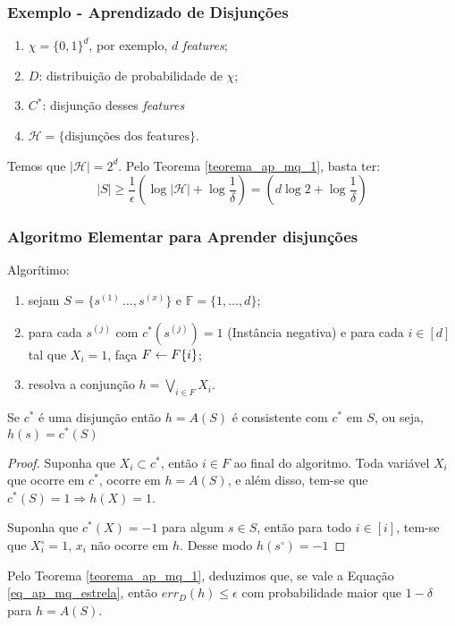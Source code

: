 \subsubsection{Exemplo - Aprendizado de Disjunções}
\begin{enumerate}
    \item $\chi = \{0,1\}^d$, por exemplo, $d$ \emph{features};
    \item $D$: distribuição de probabilidade de $\chi$;
    \item $C^*$: disjunção desses \emph{features}
    \item $\mathcal{H} = \{\text{disjunções dos features}\}$.
\end{enumerate}{}

Temos que $|\mathcal{H}| = 2^d$. Pelo Teorema \ref{teorema_ap_mq_1}, basta ter:
\begin{equation}
\label{eq_ap_mq_estrela}
    |S| \geq \frac{1}{\epsilon}\left(\log{|\mathcal{H}|} + \log{\frac{1}{\delta}}\right) = \left(d\log{2} + \log{\frac{1}{\delta}}\right)
\end{equation}

\subsubsection*{Algoritmo Elementar para Aprender disjunções}

Algorítimo:
\begin{enumerate}
    \item sejam $S = \{s^{(1)}\, \dots, s^{(x)}\}$ e $\mathbb{F} = \{1, \dots, d\}$;
    \item para cada $s^{(j)}$ com $c^*(s^{(j)}) = 1$ (Instância negativa) e para cada $i \in [d]$ tal que $X_i = 1$, faça $F \leftarrow F \\ \{i\}$;
    \item resolva a conjunção $h = \bigvee_{i \in F}X_i$.
\end{enumerate}

\begin{lema}
Se $c^*$ é uma disjunção então $h = A(S)$ é consistente com $c^*$ em $S$, ou seja, $h(s) = c^*(S)$
\end{lema}

\begin{proof}
Suponha que $X_i \subset c^*$, então $i \in F$ ao final do algoritmo.
Toda variável $X_i$ que ocorre em $c^*$, ocorre em $h = A(S)$, e além disso, tem-se que $c^*(S) = 1 \Rightarrow h(X) = 1$.

Suponha que $c^*(X) = -1$ para algum $s \in S$, então para todo $i \in [i]$, tem-se que $X_{i}^{\circ} = 1$, $x_i$ não ocorre em $h$. Desse modo $h(s^\circ) = -1$
\end{proof}

Pelo Teorema \ref{teorema_ap_mq_1}, deduzimos que, se vale a Equação \ref{eq_ap_mq_estrela}, então $err_D(h) \leq \epsilon$ com probabilidade maior que $1-\delta$ para $h=A(S)$.

